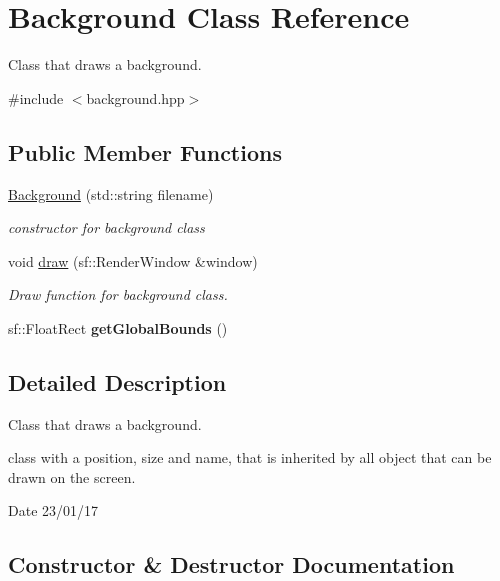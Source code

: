 \hypertarget{class_background}{}\section{Background Class Reference}
\label{class_background}


Class that draws a background.  




{\ttfamily \#include $<$background.\+hpp$>$}

\subsection*{Public Member Functions}
\begin{DoxyCompactItemize}
\item 
\hyperlink{class_background_a1aed3d561f2c5fb4bc174bc72d148129}{Background} (std\+::string filename)
\begin{DoxyCompactList}\small\item\em constructor for background class \end{DoxyCompactList}\item 
void \hyperlink{class_background_ae3d10fe0882df48b0e1e861a7e69f37f}{draw} (sf\+::\+Render\+Window \&window)
\begin{DoxyCompactList}\small\item\em Draw function for background class. \end{DoxyCompactList}\item 
sf\+::\+Float\+Rect {\bfseries get\+Global\+Bounds} ()\hypertarget{class_background_a3e97f0860839c1c06df2070250203bb5}{}\label{class_background_a3e97f0860839c1c06df2070250203bb5}

\end{DoxyCompactItemize}


\subsection{Detailed Description}
Class that draws a background. 

class with a position, size and name, that is inherited by all object that can be drawn on the screen.

\begin{DoxyDate}{Date}
23/01/17 
\end{DoxyDate}


\subsection{Constructor \& Destructor Documentation}
